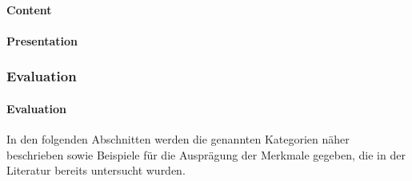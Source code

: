 \paragraph{Content}

\paragraph{Presentation}

\subsubsection{Evaluation}

\paragraph{Evaluation}

\smallbreak

In den folgenden Abschnitten werden die genannten Kategorien näher beschrieben sowie Beispiele für die Ausprägung der Merkmale gegeben, die in der Literatur bereits untersucht wurden.